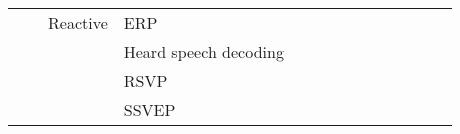 \begin{tabular}{p{1.5cm}p{1.5cm}p{1.5cm}p{1.5cm}p{0.6cm}p{0.6cm}p{0.6cm}p{0.6cm}p{0.6cm}p{0.6cm}p{0.6cm}p{0.6cm}p{0.6cm}p{0.6cm}}
                                &                 & Reactive & ERP &                                                             &                                                                       \cite{Yoon2018, Volker2018, Behncke2017, Cecotti2011} &                                                                        &                                      &                                                            &                      &                       &                                 &                         &                                                                      \\
                                &                 &                   & Heard speech decoding &                                                             &                                                                                                                             &                                                                        &                                      &                                                            &                      &                       &                                 &                         &                                                \cite{Moinnereau2018} \\
                                &                 &                   & RSVP &                                                             &                                         \cite{Parekh2018, Zafar2017, Hajinoroozi2017, Shamwell2016, Manor2015, Cecotti2014} &                                                  \cite{Spampinato2017} &                                      &                                                            &                      &                       &                                 &                         &                                                                      \\
                                &                 &                   & SSVEP &                                    \cite{Perez-Benitez2018} &                                                                                   \cite{Aznan2018, Waytowich2018, kwak2017} &                                                                        &                                      &                                                            &                      &                       &                                 &                         &                                                                      \\

\end{tabular}
